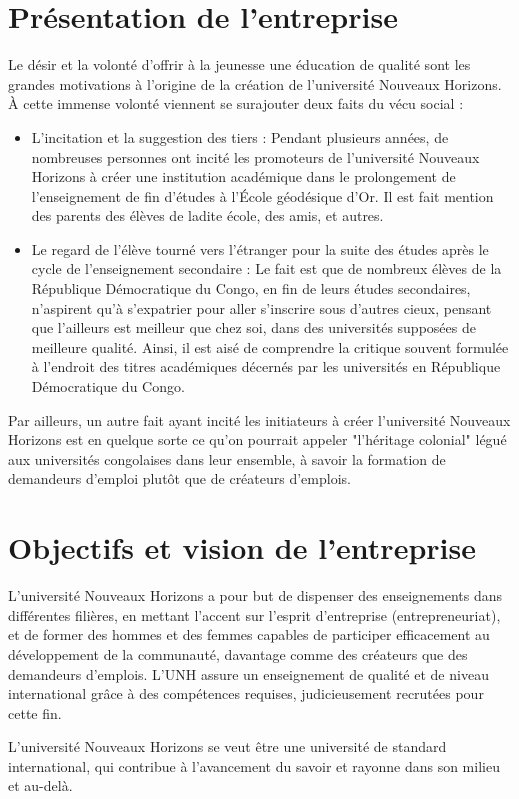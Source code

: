 \section{Présentation de l’entreprise}
Le désir et la volonté d'offrir à la jeunesse une éducation de qualité sont les grandes motivations à l'origine de la création de l'université Nouveaux Horizons. À cette immense volonté viennent se surajouter deux faits du vécu social :

\begin{itemize}
    \item  L'incitation et la suggestion des tiers : Pendant plusieurs années, de nombreuses personnes ont incité les promoteurs de l'université Nouveaux Horizons à créer une institution académique dans le prolongement de l'enseignement de fin d'études à l'École géodésique d'Or. Il est fait mention des parents des élèves de ladite école, des amis, et autres.
    \item   Le regard de l'élève tourné vers l'étranger pour la suite des études après le cycle de l'enseignement secondaire : Le fait est que de nombreux élèves de la République Démocratique du Congo, en fin de leurs études secondaires, n'aspirent qu'à s'expatrier pour aller s'inscrire sous d'autres cieux, pensant que l'ailleurs est meilleur que chez soi, dans des universités supposées de meilleure qualité. Ainsi, il est aisé de comprendre la critique souvent formulée à l'endroit des titres académiques décernés par les universités en République Démocratique du Congo.
\end{itemize}
Par ailleurs, un autre fait ayant incité les initiateurs à créer l'université Nouveaux Horizons est en quelque sorte ce qu'on pourrait appeler "l'héritage colonial" légué aux universités congolaises dans leur ensemble, à savoir la formation de demandeurs d'emploi plutôt que de créateurs d'emplois.

\section{Objectifs et vision de l’entreprise}
L'université Nouveaux Horizons a pour but de dispenser des enseignements dans différentes filières, en mettant l'accent sur l'esprit d'entreprise (entrepreneuriat), et de former des hommes et des femmes capables de participer efficacement au développement de la communauté, davantage comme des créateurs que des demandeurs d'emplois. L'UNH assure un enseignement de qualité et de niveau international grâce à des compétences requises, judicieusement recrutées pour cette fin.

L'université Nouveaux Horizons se veut être une université de standard international, qui contribue à l'avancement du savoir et rayonne dans son milieu et au-delà.